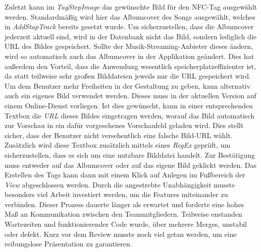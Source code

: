 \documentclass[10pt, a4paper]{article}
\begin{document}
Zuletzt kann im \textit{TagStepImage} das gewünschte Bild für den NFC-Tag ausgewählt werden.
Standardmäßig wird hier das Albumcover des Songs ausgewählt, welches in \textit{AddStapTrack} bereits gesetzt wurde.
Um sicherzustellen, dass die Albumcover jederzeit aktuell sind, wird in der Datenbank nicht das Bild, sondern lediglich die URL des Bildes gespeichert.
Sollte der Musik-Streaming-Anbieter dieses ändern, wird so automatisch auch das Albumcover in der Applikation geändert.
Dies hat außerdem den Vorteil, dass die Anwendung wesentlich speicherplatzeffizienter ist, da statt teilweise sehr großen Bilddateien jeweils nur die URL gespeichert wird.
Um dem Benutzer mehr Freiheiten in der Gestaltung zu geben, kann alternativ auch ein eigenes Bild verwendet werden.
Dieses muss in der aktuellen Version auf einem Online-Dienst vorliegen.
Ist dies gewünscht, kann in einer entsprechenden Textbox die \textit{URL} dieses Bildes eingetragen werden, worauf das Bild automatisch zur Vorschau in ein dafür vorgesehenes Vorschaufeld geladen wird.
Dies stellt sicher, dass der Benutzer nicht versehentlich eine falsche Bild-URL wählt.
Zusätzlich wird diese Textbox zusätzlich mittels eines \textit{RegEx} geprüft, um sicherzustellen, dass es sich um eine nutzbare Bilddatei handelt.
Zur Bestätigung muss entweder auf das Albumcover oder auf das eigene Bild geklickt werden.
Das Erstellen des Tags kann dann mit einem Klick auf \glqq Anlegen\grqq{} im Fußbereich der \textit{View} abgeschlossen werden.
Durch die angestrebte Unabhängigkeit musste besonders viel Arbeit investiert werden, um die Features miteinander zu verbinden.
Dieser Prozess dauerte länger als erwartet und forderte eine hohes Maß an Kommunikation zwischen den Teammitgliedern.
Teilweise enstanden Wartezeiten und funktionierender Code wurde, über mehrere Merges, unstabil oder defekt.
Kurz vor dem Review musste noch viel getan werden, um eine reibungslose Präsentation zu garantieren.
\end{document}
